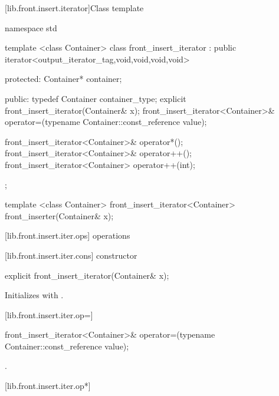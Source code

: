 [lib.front.insert.iterator]{Class template }

%
\begin{codeblock}
namespace std {
  template <class Container>
  class front_insert_iterator :
        public iterator<output_iterator_tag,void,void,void,void> {
  protected:
    Container* container;

  public:
    typedef Container container_type;
    explicit front_insert_iterator(Container& x);
    front_insert_iterator<Container>&
      operator=(typename Container::const_reference value);

    front_insert_iterator<Container>& operator*();
    front_insert_iterator<Container>& operator++();
    front_insert_iterator<Container>  operator++(int);
  };

  template <class Container>
    front_insert_iterator<Container> front_inserter(Container& x);
}
\end{codeblock}

[lib.front.insert.iter.ops]{ operations}

[lib.front.insert.iter.cons]{ constructor}

%
\begin{itemdecl}
explicit front_insert_iterator(Container& x);
\end{itemdecl}

\begin{itemdescr}
\pnum
\effects
Initializes
with .
\end{itemdescr}

[lib.front.insert.iter.op=]{}

%
\begin{itemdecl}
front_insert_iterator<Container>&
  operator=(typename Container::const_reference value);
\end{itemdecl}

\begin{itemdescr}
\pnum
\effects
{}

\pnum
\returns
{}.
\end{itemdescr}

[lib.front.insert.iter.op*]{}


